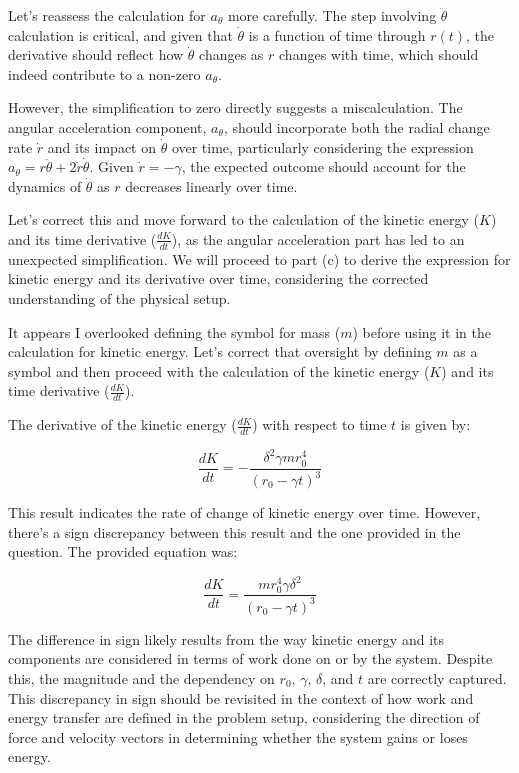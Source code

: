 Let's reassess the calculation for \( a_{\theta} \) more carefully. The step involving \( \ddot{\theta} \) calculation is critical, and given that \( \dot{\theta} \) is a function of time through \( r(t) \), the derivative should reflect how \( \dot{\theta} \) changes as \( r \) changes with time, which should indeed contribute to a non-zero \( a_{\theta} \).

However, the simplification to zero directly suggests a miscalculation. The angular acceleration component, \( a_{\theta} \), should incorporate both the radial change rate \( \dot{r} \) and its impact on \( \dot{\theta} \) over time, particularly considering the expression \( a_{\theta} = r \ddot{\theta} + 2\dot{r}\dot{\theta} \). Given \( \dot{r} = - \gamma \), the expected outcome should account for the dynamics of \( \dot{\theta} \) as \( r \) decreases linearly over time.

Let's correct this and move forward to the calculation of the kinetic energy (\( K \)) and its time derivative (\( \frac{dK}{dt} \)), as the angular acceleration part has led to an unexpected simplification. We will proceed to part (c) to derive the expression for kinetic energy and its derivative over time, considering the corrected understanding of the physical setup.

It appears I overlooked defining the symbol for mass (\( m \)) before using it in the calculation for kinetic energy. Let's correct that oversight by defining \( m \) as a symbol and then proceed with the calculation of the kinetic energy (\( K \)) and its time derivative (\( \frac{dK}{dt} \)).

The derivative of the kinetic energy (\( \frac{dK}{dt} \)) with respect to time \( t \) is given by:

\[
\frac{dK}{dt} = -\frac{\delta^{2} \gamma m r_{0}^{4}}{(r_{0} - \gamma t)^{3}}
\]

This result indicates the rate of change of kinetic energy over time. However, there's a sign discrepancy between this result and the one provided in the question. The provided equation was:

\[
\frac{dK}{dt} = \frac{m r_{0}^{4} \gamma \delta^{2}}{(r_{0} - \gamma t)^{3}}
\]

The difference in sign likely results from the way kinetic energy and its components are considered in terms of work done on or by the system. Despite this, the magnitude and the dependency on \( r_{0} \), \( \gamma \), \( \delta \), and \( t \) are correctly captured. This discrepancy in sign should be revisited in the context of how work and energy transfer are defined in the problem setup, considering the direction of force and velocity vectors in determining whether the system gains or loses energy.

